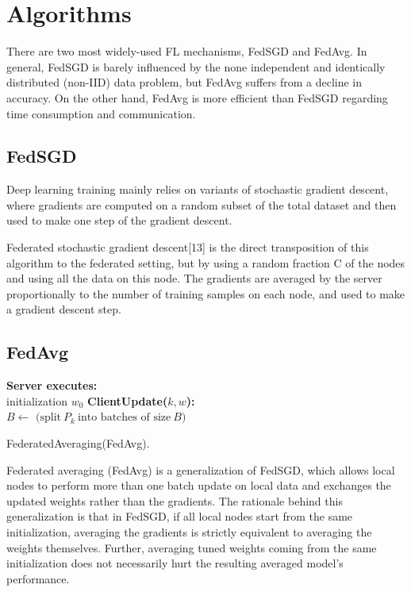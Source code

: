 \documentclass{article}
\theoremstyle{theorem}
\theoremstyle{definition}
\begin{document}
	\section{Algorithms}
	There are two most widely-used FL mechanisms, FedSGD and FedAvg. In general, FedSGD is barely influenced by the none
	independent and identically distributed (non-IID) data problem, but FedAvg suffers from a decline in accuracy. On the other hand, FedAvg is more efficient than FedSGD regarding time consumption and communication.
	\subsection{FedSGD}
Deep learning training mainly relies on variants of stochastic gradient descent, where gradients are computed on a random subset of the total dataset and then used to make one step of the gradient descent.

Federated stochastic gradient descent[13] is the direct transposition of this algorithm to the federated setting, but by using a random fraction C of the nodes and using all the data on this node. The gradients are averaged by the server proportionally to the number of training samples on each node, and used to make a gradient descent step.

	\subsection{FedAvg}
	
	\begin{algorithm}[H]
		\SetAlgoLined
		\textbf{Server executes:} \\
		initialization $w_0$ \;
	\textbf{ClientUpdate($k,w$):}\\
	$B \leftarrow \text{ (split} \ P_k	\ \text{into batches of size} \ B )$\\
		\caption{FederatedAveraging(FedAvg).}
	\end{algorithm}
Federated averaging (FedAvg) is a generalization of FedSGD, which allows local nodes to perform more than one batch update on local data and exchanges the updated weights rather than the gradients. The rationale behind this generalization is that in FedSGD, if all local nodes start from the same initialization, averaging the gradients is strictly equivalent to averaging the weights themselves. Further, averaging tuned weights coming from the same initialization does not necessarily hurt the resulting averaged model's performance.
\end{document}
